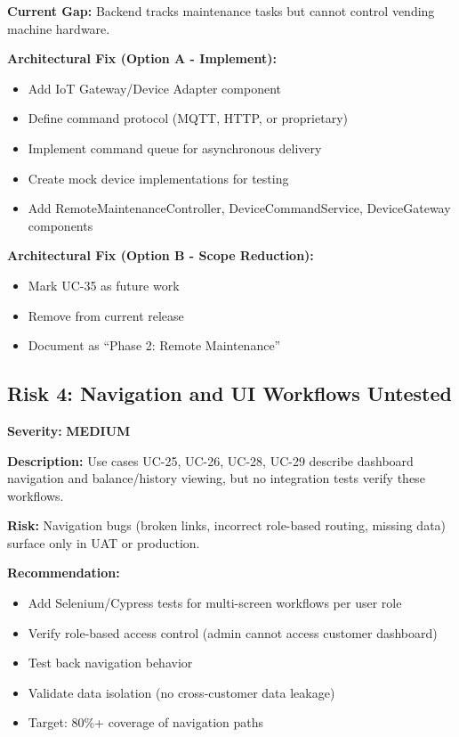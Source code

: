 \documentclass[11pt,a4paper]{article}
\begin{document}
\textbf{Current Gap:} Backend tracks maintenance tasks but cannot control vending machine hardware.

\textbf{Architectural Fix (Option A - Implement):}
\begin{itemize}
    \item Add IoT Gateway/Device Adapter component
    \item Define command protocol (MQTT, HTTP, or proprietary)
    \item Implement command queue for asynchronous delivery
    \item Create mock device implementations for testing
    \item Add RemoteMaintenanceController, DeviceCommandService, DeviceGateway components
\end{itemize}

\textbf{Architectural Fix (Option B - Scope Reduction):}
\begin{itemize}
    \item Mark UC-35 as future work
    \item Remove from current release
    \item Document as ``Phase 2: Remote Maintenance''
\end{itemize}

\subsection{Risk 4: Navigation and UI Workflows Untested}

\textbf{Severity:} \textbf{MEDIUM}

\textbf{Description:} Use cases UC-25, UC-26, UC-28, UC-29 describe dashboard navigation and balance/history viewing, but no integration tests verify these workflows.

\textbf{Risk:} Navigation bugs (broken links, incorrect role-based routing, missing data) surface only in UAT or production.

\textbf{Recommendation:}
\begin{itemize}
    \item Add Selenium/Cypress tests for multi-screen workflows per user role
    \item Verify role-based access control (admin cannot access customer dashboard)
    \item Test back navigation behavior
    \item Validate data isolation (no cross-customer data leakage)
    \item Target: 80\%+ coverage of navigation paths
\end{itemize}
\end{document}
